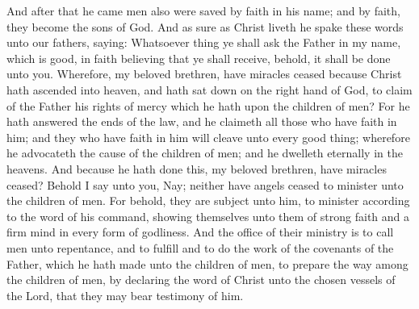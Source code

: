 And after that he came men also were saved by faith in his name; and by faith, they become the sons of God. And as sure as Christ liveth he spake these words unto our fathers, saying: Whatsoever thing ye shall ask the Father in my name, which is good, in faith believing that ye shall receive, behold, it shall be done unto you.
\bverse \iffalse Wherefore, my beloved brethren, have miracles ceased because Christ hath ascended into heaven, and hath sat down on the right hand of God, to claim of the Father his rights of mercy which he hath upon the children of men? \fi
Wherefore, my beloved brethren, have miracles ceased because Christ hath ascended into heaven, and hath sat down on the right hand of God, to claim of the Father his rights of mercy which he hath upon the children of men?
\bverse \iffalse For he hath answered the ends of the law, and he claimeth all those who have faith in him; and they who have faith in him will cleave unto every good thing; wherefore he advocateth the cause of the children of men; and he dwelleth eternally in the heavens. \fi
For he hath answered the ends of the law, and he claimeth all those who have faith in him; and they who have faith in him will cleave unto every good thing; wherefore he advocateth the cause of the children of men; and he dwelleth eternally in the heavens.
\bverse \iffalse And because he hath done this, my beloved brethren, have miracles ceased? Behold I say unto you, Nay; neither have angels ceased to minister unto the children of men. \fi
And because he hath done this, my beloved brethren, have miracles ceased? Behold I say unto you, Nay; neither have angels ceased to minister unto the children of men.
\bverse \iffalse For behold, they are subject unto him, to minister according to the word of his command, showing themselves unto them of strong faith and a firm mind in every form of godliness. \fi
For behold, they are subject unto him, to minister according to the word of his command, showing themselves unto them of strong faith and a firm mind in every form of godliness.
\bverse \iffalse And the office of their ministry is to call men unto repentance, and to fulfill and to do the work of the covenants of the Father, which he hath made unto the children of men, to prepare the way among the children of men, by declaring the word of Christ unto the chosen vessels of the Lord, that they may bear testimony of him. \fi
And the office of their ministry is to call men unto repentance, and to fulfill and to do the work of the covenants of the Father, which he hath made unto the children of men, to prepare the way among the children of men, by declaring the word of Christ unto the chosen vessels of the Lord, that they may bear testimony of him.
